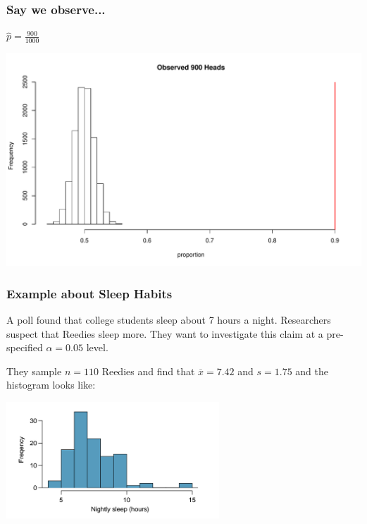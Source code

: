 \documentclass[slides]{beamer}
\newcommand{\xbar}{\overline{x}}
\begin{document}
\begin{frame}
\frametitle{Say we observe...}
$\widehat{p} = \frac{900}{1000}$
\begin{center}
\includegraphics[width=\textwidth]{figure/hist4}
\end{center}
\end{frame}


\begin{frame}
\frametitle{Example about Sleep Habits}
A poll found that college students sleep about 7 hours a night.  Researchers suspect that Reedies sleep more.   They want to investigate this claim at a pre-specified $\alpha=0.05$ level.  

\vspace{0.5cm}

\pause They sample $n=110$ Reedies and find that $\xbar = 7.42$ and $s=1.75$ and the histogram looks like:

\begin{center}
\includegraphics[width=0.6\textwidth]{figure/sleep.png}
\end{center}

\end{frame}
\end{document}
